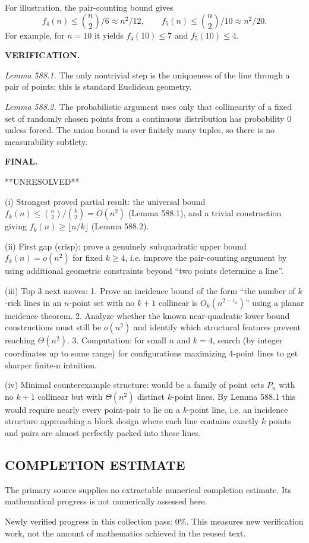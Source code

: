 For illustration, the pair-counting bound gives
\[f_4(n)\le \binom{n}{2}/6\approx n^2/12,\qquad f_5(n)\le \binom{n}{2}/10\approx n^2/20.\]
For example, for $n=10$ it yields $f_4(10)\le 7$ and $f_5(10)\le 4$.

\bigskip
\noindent\textbf{VERIFICATION.}

\emph{Lemma 588.1.} The only nontrivial step is the uniqueness of the line through a pair of points; this is standard Euclidean geometry.

\emph{Lemma 588.2.} The probabilistic argument uses only that collinearity of a fixed set of randomly chosen points from a continuous distribution has probability $0$ unless forced. The union bound is over finitely many tuples, so there is no measurability subtlety.

\bigskip
\noindent\textbf{FINAL.}

**UNRESOLVED**

(i) Strongest proved partial result: the universal bound $f_k(n)\le \binom{n}{2}/\binom{k}{2}=O(n^2)$ (Lemma 588.1), and a trivial construction giving $f_k(n)\ge\lfloor n/k\rfloor$ (Lemma 588.2).

(ii) First gap (crisp): prove a genuinely subquadratic upper bound $f_k(n)=o(n^2)$ for fixed $k\ge 4$, i.e. improve the pair-counting argument by using additional geometric constraints beyond ``two points determine a line''.

(iii) Top 3 next moves:
1. Prove an incidence bound of the form ``the number of $k$-rich lines in an $n$-point set with no $k+1$ collinear is $O_k(n^{2-\varepsilon_k})$'' using a planar incidence theorem.
2. Analyze whether the known near-quadratic lower bound constructions must still be $o(n^2)$ and identify which structural features prevent reaching $\Theta(n^2)$.
3. Computation: for small $n$ and $k=4$, search (by integer coordinates up to some range) for configurations maximizing 4-point lines to get sharper finite-n intuition.

(iv) Minimal counterexample structure: would be a family of point sets $P_n$ with no $k+1$ collinear but with $\Theta(n^2)$ distinct $k$-point lines. By Lemma 588.1 this would require nearly every point-pair to lie on a $k$-point line, i.e. an incidence structure approaching a block design where each line contains exactly $k$ points and pairs are almost perfectly packed into these lines.




\subsection*{COMPLETION ESTIMATE}
The primary source supplies no extractable numerical completion estimate. Its mathematical progress is not numerically assessed here.

Newly verified progress in this collection pass: $0\%$. This measures new verification work, not the amount of mathematics achieved in the reused text.

